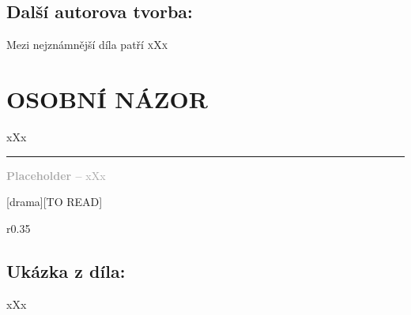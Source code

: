 \documentclass{extarticle} %
\begin{document}

\subsection*{Další autorova tvorba:}
\noindent 
Mezi nejznámnější díla patří \textsc{xXx}






\section*{OSOBNÍ NÁZOR}
\noindent 
xXx

\vfill

\noindent\begin{minipage}{\textwidth}
    \textcolor{darkgray}{\rule{\linewidth}{0.4pt}
    \footnotesize
    \textbf{Placeholder --} xXx
    }
\end{minipage}

\newpage


\changefontsize{8pt}

[drama][TO READ]

\noindent\begin{wrapfigure}{r}{0.35\textwidth}
\tiny

\subsection*{Ukázka z díla:}
\setlength{\parindent}{3pt}
xXx
\end{wrapfigure}
\end{document}
